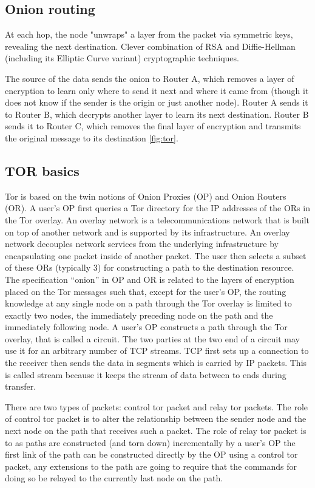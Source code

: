 \subsection{Onion routing}
At each hop, the node "unwraps" a layer from the packet via symmetric keys, revealing the next destination. Clever combination of RSA and Diffie-Hellman (including its Elliptic Curve variant) cryptographic techniques.

The source of the data sends the onion to Router A, which removes a layer of encryption to learn only where to send it next and where it came from (though it does not know if the sender is the origin or just another node). Router A sends it to Router B, which decrypts another layer to learn its next destination. Router B sends it to Router C, which removes the final layer of encryption and transmits the original message to its destination \ref{fig:tor}.

\subsection{TOR basics}

Tor is based on the twin notions of Onion Proxies (OP) and Onion Routers (OR). A user’s OP first queries a Tor directory for the IP addresses of the ORs in the Tor overlay. 
An overlay network is a telecommunications network that is built on top of another network and is supported by its infrastructure. An overlay network decouples network services from the underlying infrastructure by encapsulating one packet inside of another packet.
The user then selects a subset of these ORs (typically 3) for constructing a path to the destination resource. The specification “onion” in OP and OR is related to the layers of encryption placed on the Tor messages such that, except for the user’s OP, the routing knowledge at any single node on a path through the Tor overlay is limited to exactly two nodes, the immediately preceding node on the path and the immediately following node. A user’s OP constructs a path through the Tor overlay, that is called a circuit. The two parties at the two end of a circuit may use it for an arbitrary number of TCP streams.
TCP first sets up a connection to the receiver then sends the data in segments which is carried by IP packets. This is called stream because it keeps the stream of data between to ends during transfer.


There are two types of packets: control tor packet and relay tor packets. The role of control tor packet is to alter the relationship between the sender node and the next node on the path that receives such a packet.
The role of relay tor packet is to as paths are constructed (and torn down) incrementally by a user’s OP the first link of the path can be constructed directly by the OP using a control tor packet, any extensions to the path are going to require that the commands for doing so be relayed to the currently last node on the path.

